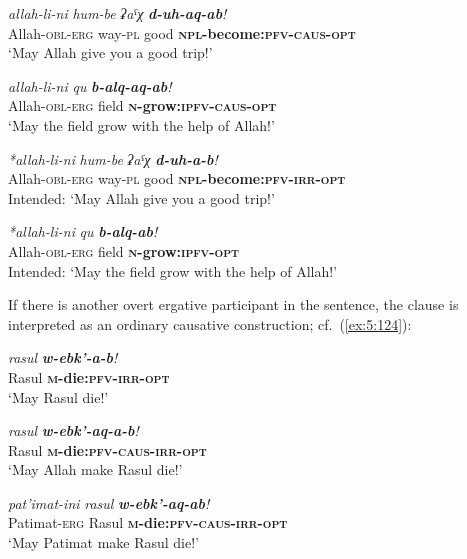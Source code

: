 ﻿\documentclass[output=paper]{langsci/langscibook}
\begin{document}
\ea \label{ex:5:118} %
\gll \emph{allah-li-ni} \emph{hum-be} \emph{ʡaˤχ} \emph{\textbf{d-uh-aq-ab}!}\\
 Allah-\textsc{obl}-\textsc{erg} way-\textsc{pl} good \textbf{\textsc{npl}-become:\textsc{pfv}-\textsc{caus}-\textsc{opt}}\\
\glt `May Allah give you a good trip!'

\ex \label{ex:5:119} %
\gll \emph{allah-li-ni} \emph{qu} \emph{\textbf{b-alq-aq-ab}!}\\
 Allah-\textsc{obl}-\textsc{erg} field \textbf{\textsc{n}-grow:\textsc{ipfv}-\textsc{caus}-\textsc{opt}}\\
\glt `May the field grow with the help of Allah!'

\ex \label{ex:5:120} %
\gll \emph{*allah-li-ni} \emph{hum-be} \emph{ʡaˤχ} \emph{\textbf{d-uh-a-b}!}\\
 Allah-\textsc{obl}-\textsc{erg} way-\textsc{pl} good \textbf{\textsc{npl}-become:\textsc{pfv}-\textsc{irr}-\textsc{opt}}\\
\glt Intended: `May Allah give you a good trip!'

\ex \label{ex:5:121} %
\gll \emph{*allah-li-ni} \emph{qu} \emph{\textbf{b-alq-ab}!}\\
 Allah-\textsc{obl}-\textsc{erg} field \textbf{\textsc{n}-grow:\textsc{ipfv}-\textsc{opt}}\\
\glt Intended: `May the field grow with the help of Allah!'
\z

If there is another overt ergative participant in the sentence, the
clause is interpreted as an ordinary causative construction; cf.\ (\ref{ex:5:124}):

\ea %
\gll \emph{rasul} \emph{\textbf{w-ebk'-a-b}!}\\
 Rasul \textbf{\textsc{m}-die:\textsc{pfv}-\textsc{irr}-\textsc{opt}}\\
\glt `May Rasul die!'

\ex %
\gll \emph{rasul} \emph{\textbf{w-ebk'-aq-a-b}!}\\
 Rasul \textbf{\textsc{m}-die:\textsc{pfv}-\textsc{caus}-\textsc{irr}-\textsc{opt}}\\
\glt `May Allah make Rasul die!'

\ex \label{ex:5:124} %
\gll \emph{pat'imat-ini} \emph{rasul}  \emph{\textbf{w-ebk'-aq-ab}!}\\
 Patimat-\textsc{erg} Rasul \textbf{\textsc{m}-die:\textsc{pfv}-\textsc{caus}-\textsc{irr}-\textsc{opt}}\\
\glt `May Patimat make Rasul die!'
\z
\end{document}

